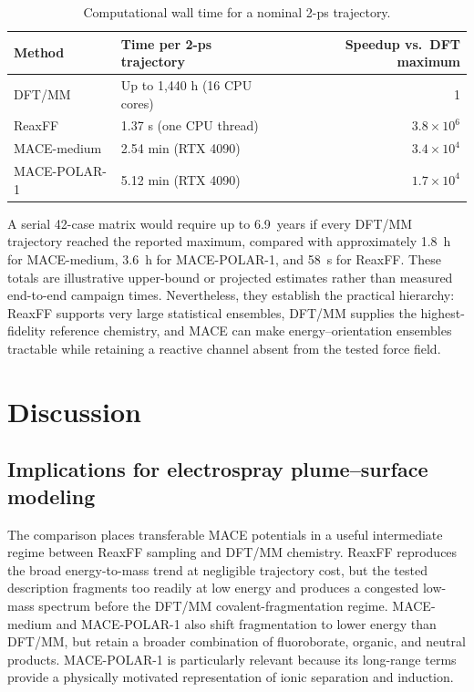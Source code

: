 \documentclass[preprint,review,12pt]{elsarticle}
\begin{document}
\begin{table}[htbp]
\centering
\caption{Computational wall time for a nominal 2-ps trajectory.}
\label{tab:performance}
\begin{tabularx}{\linewidth}{@{}lXr@{}}
\toprule
Method & Time per 2-ps trajectory & Speedup vs.\ DFT maximum \\
\midrule
DFT/MM       & Up to 1,440 h (16 CPU cores) & 1 \\
ReaxFF       & 1.37 s (one CPU thread)       & \(3.8\times10^6\) \\
MACE-medium  & 2.54 min (RTX 4090)           & \(3.4\times10^4\) \\
MACE-POLAR-1 & 5.12 min (RTX 4090)           & \(1.7\times10^4\) \\
\bottomrule
\end{tabularx}
\end{table}

A serial 42-case matrix would require up to 6.9~years if every DFT/MM
trajectory reached the reported maximum, compared with approximately 1.8~h
for MACE-medium, 3.6~h for MACE-POLAR-1, and 58~s for ReaxFF. These totals are
illustrative upper-bound or projected estimates rather than measured
end-to-end campaign times. Nevertheless, they establish the practical
hierarchy: ReaxFF supports very large statistical ensembles, DFT/MM supplies
the highest-fidelity reference chemistry, and MACE can make
energy--orientation ensembles tractable while retaining a reactive channel
absent from the tested force field.

\section{Discussion}
\label{sec:discussion}

\subsection{Implications for electrospray plume--surface modeling}
\label{sec:propulsion_implications}

The comparison places transferable MACE potentials in a useful intermediate
regime between ReaxFF sampling and DFT/MM chemistry. ReaxFF reproduces the
broad energy-to-mass trend at negligible trajectory cost, but the tested
description fragments too readily at low energy and produces a congested
low-mass spectrum before the DFT/MM covalent-fragmentation regime.
MACE-medium and MACE-POLAR-1 also shift fragmentation to lower energy than
DFT/MM, but retain a broader combination of fluoroborate, organic, and neutral
products. MACE-POLAR-1 is particularly relevant because its long-range terms
provide a physically motivated representation of ionic separation and
induction.
\end{document}
